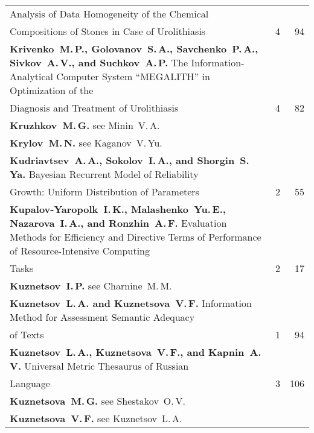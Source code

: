 {\begin{tabular}{p{397pt}rr}
Analysis of Data Homogeneity of the Chemical\linebreak
\vspace*{-12pt}\\
\hspace*{23pt}Compositions of Stones in Case of Urolithiasis\dotfill&4&94\\
\hangindent=23pt\noindent\textbf{Krivenko~M.\,P., Golovanov~S.\,A., 
Savchenko~P.\,A., Sivkov~A.\,V., and Suchkov~A.\,P.} The Information-Analytical 
Computer System ``MEGALITH'' in Optimization of the\linebreak
\vspace*{-12pt}\\
\hspace*{23pt}Diagnosis and Treatment of Urolithiasis\dotfill&4&82\\
\textbf{Kruzhkov~M.\,G.} see Minin~V.\,A.&&\\
\textbf{Krylov~M.\,N.} see Kaganov~V.\,Yu.&&\\
\textbf{Kudriavtsev~A.\,A., Sokolov~I.\,A., and Shorgin~S.\,Ya.}
Bayesian Recurrent Model of Reliability\linebreak
\vspace*{-12pt}\\
\hspace*{23pt}Growth: Uniform Distribution of Parameters\dotfill&2&55\\
\hangindent=23pt\noindent\textbf{Kupalov-Yaropolk~I.\,K., Malashenko~Yu.\,E., Nazarova~I.\,A.,
and Ronzhin~A.\,F.}
Evaluation Methods for Efficiency and Directive Terms of Performance of
Resource-Intensive Computing\linebreak
\vspace*{-12pt}\\
\hspace*{23pt}Tasks\dotfill&2&17\\
\textbf{Kuznetsov~I.\,P.} see Charnine~M.\,M.&&\\
\textbf{Kuznetsov~L.\,A. and Kuznetsova~V.\,F.}
Information Method for Assessment Semantic Adequacy\linebreak
\vspace*{-12pt}\\
\hspace*{23pt}of Texts\dotfill&1&94\\
\textbf{Kuznetsov~L.\,A., Kuznetsova~V.\,F., and Kapnin~A.\,V.}
Universal Metric Thesaurus of Russian\linebreak
\vspace*{-12pt}\\
\hspace*{23pt}Language\dotfill&3&106\\
\textbf{Kuznetsova~M.\,G.} see Shestakov~O.\,V.&&\\
\textbf{Kuznetsova~V.\,F.} see Kuznetsov~L.\,A.&&\\
\end{tabular}
}
\pagebreak

